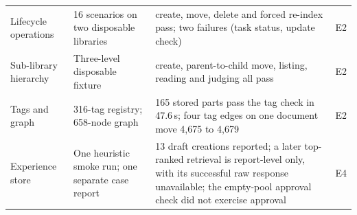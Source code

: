\begin{table}
\begin{tabular}{@{}p{1.898cm}p{4.373cm}p{6.435cm}p{1.650cm}@{}}
Lifecycle operations & 16 scenarios on two disposable libraries & create, move, delete and forced re-index pass; two failures (task status, update check) & E2\\
Sub-library hierarchy & Three-level disposable fixture & create, parent-to-child move, listing, reading and judging all pass & E2\\
Tags and graph & 316-tag registry; 658-node graph & 165 stored parts pass the tag check in 47.6\,s; four tag edges on one document move 4{,}675 to 4{,}679 & E2\\
Experience store & One heuristic smoke run; one separate case report & 13 draft creations reported; a later top-ranked retrieval is report-level only, with its successful raw response unavailable; the empty-pool approval check did not exercise approval & E4\\
\bottomrule
\end{tabular}
\end{table}
